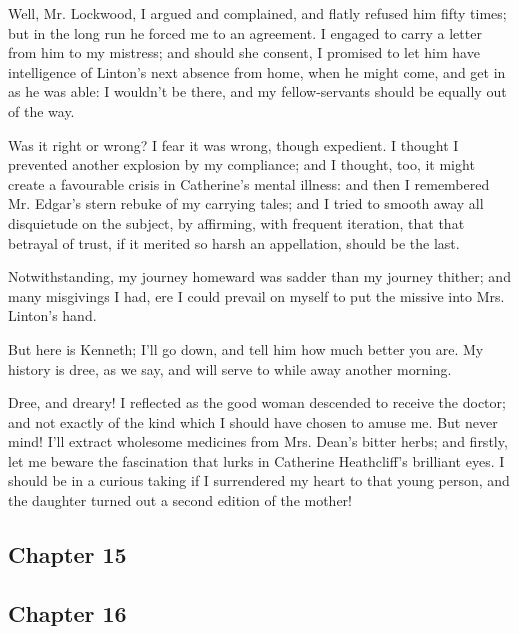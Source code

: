 \par Well, Mr. Lockwood, I argued and complained, and flatly refused him fifty times; but in the long run he forced me to an agreement. I engaged to carry a letter from him to my mistress; and should she consent, I promised to let him have intelligence of Linton's next absence from home, when he might come, and get in as he was able: I wouldn't be there, and my fellow-servants should be equally out of the way.
\par Was it right or wrong? I fear it was wrong, though expedient. I thought I prevented another explosion by my compliance; and I thought, too, it might create a favourable crisis in Catherine's mental illness: and then I remembered Mr. Edgar's stern rebuke of my carrying tales; and I tried to smooth away all disquietude on the subject, by affirming, with frequent iteration, that that betrayal of trust, if it merited so harsh an appellation, should be the last.
\par Notwithstanding, my journey homeward was sadder than my journey thither; and many misgivings I had, ere I could prevail on myself to put the missive into Mrs. Linton's hand.
\par But here is Kenneth; I'll go down, and tell him how much better you are. My history is dree, as we say, and will serve to while away another morning.
\par Dree, and dreary! I reflected as the good woman descended to receive the doctor; and not exactly of the kind which I should have chosen to amuse me. But never mind! I'll extract wholesome medicines from Mrs. Dean's bitter herbs; and firstly, let me beware the fascination that lurks in Catherine Heathcliff's brilliant eyes. I should be in a curious taking if I surrendered my heart to that young person, and the daughter turned out a second edition of the mother!






\subsection*{Chapter 15}







\subsection*{Chapter 16}







